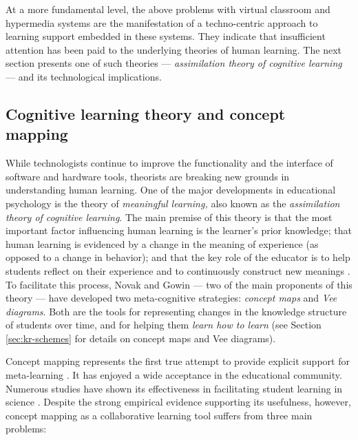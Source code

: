 At a more fundamental level, the above problems with virtual classroom and
hypermedia systems are the manifestation of a techno-centric approach to
learning support embedded in these systems. They indicate that insufficient
attention has been paid to the underlying theories of human learning. The
next section presents one of such theories --- {\it assimilation theory of
cognitive learning\/} --- and its technological implications.


\subsection{Cognitive learning theory and concept mapping}

While technologists continue to improve the functionality and the interface
of software and hardware tools, theorists are breaking new grounds in
understanding human learning. One of the major developments in educational
psychology is the theory of {\it meaningful learning,\/} also known as the
{\it assimilation theory of cognitive learning\/}. The main premise of this
theory is that the most important factor influencing human learning is the
learner's prior knowledge; that human learning is evidenced by a change in
the meaning of experience (as opposed to a change in behavior); and that
the key role of the educator is to help students reflect on their
experience and to continuously construct new meanings
\cite{Ausubel63,Ausubel78}. To facilitate this process, Novak and Gowin
\cite{Novak84} --- two of the main proponents of this theory --- have
developed two meta-cognitive strategies: {\it concept maps\/} and {\it Vee
diagrams\/}. Both are the tools for representing changes in the knowledge
structure of students over time, and for helping them {\it learn how to
learn\/} (see Section \ref{sec:kr-schemes} for details on concept maps and
Vee diagrams).

Concept mapping represents the first true attempt to provide explicit
support for meta-learning \cite{Novak84}. It has enjoyed a wide acceptance
in the educational community. Numerous studies have shown its effectiveness
in facilitating student learning in science
\cite{Cliburn90,Novak90,Roth92}. Despite the strong empirical evidence
supporting its usefulness, however, concept mapping as a collaborative
learning tool suffers from three main problems:

